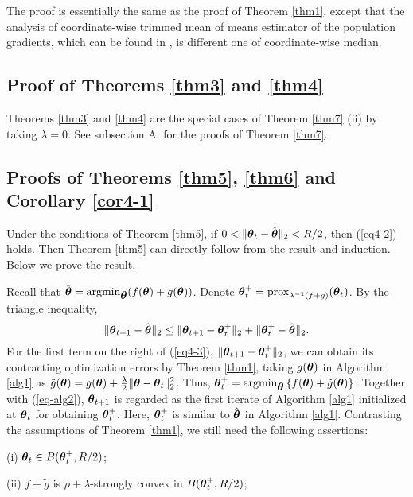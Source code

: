 \documentclass[12pt,a4paper]{article}%
\newcommand{\be}{\begin{equation}}
\newcommand{\ee}{\end{equation}}
\newcommand \vc[1]{{\mbox{\boldmath${#1}$}}}
\newcommand \vtheta{\vc \theta}
\numberwithin{equation}{section}
\newcommand{\bbr}[1]{\left\{#1\right\}}      %
\begin{document}
 The proof is essentially the same as the proof of Theorem \ref{thm1}, except that  the analysis of coordinate-wise trimmed mean of means estimator of the population gradients, which can be found in \cite{YinChenRB2018}, is different one of coordinate-wise median.

\subsection{Proof of Theorems \ref{thm3} and \ref{thm4}}

Theorems \ref{thm3} and \ref{thm4} are the special cases of Theorem \ref{thm7} (ii) by taking $\lambda=0$. See subsection A. for the proofs of Theorem \ref{thm7}.

\subsection{Proofs of Theorems \ref{thm5}, \ref{thm6} and Corollary \ref{cor4-1}}

 Under the conditions of Theorem \ref{thm5}, if $0<\|\vtheta_t-\hat{\vtheta}\|_2<R/2$, then (\ref{eq4-2}) holds. Then Theorem \ref{thm5} can directly follow from the result and induction. Below we prove the result.

Recall that $\hat{\vtheta}=\mathrm{argmin}_\vtheta(f(\vtheta)+g(\vtheta))$. Denote $\vtheta_t^+=\mathrm{prox}_{\lambda^{-1}(f+g)}(\vtheta_t)$. By the triangle inequality,
\be\label{eq4-3}
\|\vtheta_{t+1}-\hat{\vtheta}\|_2\leq \|\vtheta_{t+1}-\vtheta_t^+\|_2+\|\vtheta_t^+-\hat{\vtheta}\|_2.
\ee
For the first term on the right of (\ref{eq4-3}), $\|\vtheta_{t+1}-\vtheta_t^+\|_2$, we can obtain its contracting optimization errors by Theorem \ref{thm1}, taking $g(\vtheta)$ in Algorithm \ref{alg1} as $\tilde{g}(\vtheta)=g(\vtheta)+\frac{\lambda}{2}\|\vtheta-\vtheta_t\|_2^2$.
Thus, $\vtheta_t^+=\mathrm{argmin}_\vtheta\bbr{f(\vtheta)+\tilde{g}(\vtheta)}$. Together with (\ref{eq-alg2}), $\vtheta_{t+1}$ is regarded as the first iterate of Algorithm \ref{alg1} initialized at $\vtheta_t$ for obtaining $\vtheta_t^+$. Here, $\vtheta_t^+$ is similar to $\hat{\vtheta}$ in Algorithm \ref{alg1}. Contrasting the assumptions of Theorem \ref{thm1}, we still need the following assertions:

(i) $\vtheta_t\in B(\vtheta_t^+,R/2)$;

(ii) $f+\tilde{g}$ is $\rho+\lambda$-strongly convex in $B(\vtheta_t^+, R/2)$;
\end{document}
